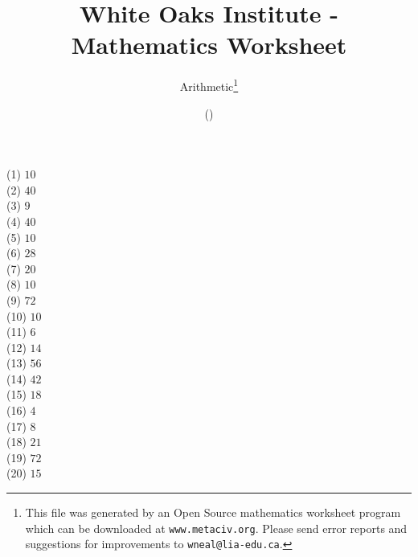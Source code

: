 \documentclass[letter]{article}
\begin{document}
\title{White Oaks Institute - Mathematics Worksheet}
\author{Arithmetic\thanks{This file was generated by an \textsf{Open Source} mathematics worksheet program which can be downloaded at \texttt{www.metaciv.org}. Please send error reports and suggestions for improvements to \texttt{wneal@lia-edu.ca}.}}
\date{\XCfileversion{} (\XCfiledate)}
\maketitle
\setlength{\parskip}{12mm plus 4mm minus 4mm}\setlength{\parindent}{0cm}\begin{multicols}{2}(1) $10$\\(2) $40$\\(3) $9$\\(4) $40$\\(5) $10$\\(6) $28$\\(7) $20$\\(8) $10$\\(9) $72$\\(10) $10$\\(11) $6$\\(12) $14$\\(13) $56$\\(14) $42$\\(15) $18$\\(16) $4$\\(17) $8$\\(18) $21$\\(19) $72$\\(20) $15$\\\end{multicols}
\end{document}
